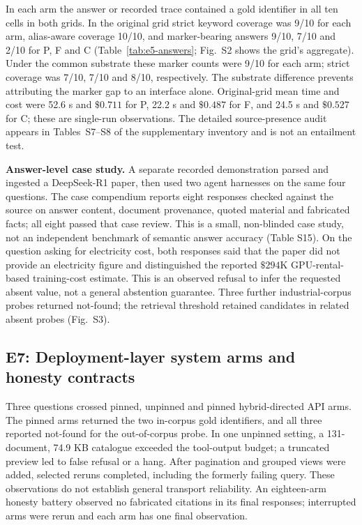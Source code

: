 In each arm the answer or recorded trace contained a gold identifier in all
ten cells in both grids. In the
original grid strict keyword coverage was 9/10 for each arm, alias-aware
coverage 10/10, and marker-bearing answers 9/10, 7/10 and 2/10 for P, F and
C (Table~\ref{tab:e5-answers}; Fig.~S2 shows the grid's aggregate). Under the common substrate these marker
counts were 9/10 for each arm; strict coverage was 7/10, 7/10 and 8/10,
respectively. The substrate difference prevents attributing the marker gap to
an interface alone. Original-grid mean time and cost were 52.6 s and $\$0.711$
for P, 22.2 s and $\$0.487$ for F, and 24.5 s and $\$0.527$ for C; these are
single-run observations. The detailed source-presence audit appears in
Tables~S7--S8 of the supplementary inventory and is not an entailment test.

\textbf{Answer-level case study.} A separate recorded demonstration parsed and
ingested a DeepSeek-R1 paper, then used two agent harnesses on the same four
questions. The case compendium reports eight responses checked against the
source on answer content, document provenance, quoted material and fabricated
facts; all eight passed that case review. This is a small, non-blinded case
study, not an independent benchmark of semantic answer accuracy (Table S15). On the
question asking for electricity cost, both responses said that the paper did
not provide an electricity figure and distinguished the reported $\$294$K
GPU-rental-based training-cost estimate. This is an observed refusal to infer
the requested absent value, not a general abstention guarantee. Three further
industrial-corpus probes returned not-found; the retrieval threshold retained
candidates in related absent probes (Fig.~S3).

\subsection{E7: Deployment-layer system arms and honesty contracts}
\label{sec:sysarms}
Three questions crossed pinned, unpinned and pinned hybrid-directed API arms.
The pinned arms returned the two in-corpus gold identifiers, and all three
reported not-found for the out-of-corpus probe. In one unpinned setting, a
131-document, 74.9 KB catalogue exceeded the tool-output budget; a truncated
preview led to false refusal or a hang. After pagination and grouped views were
added, selected reruns completed, including the formerly failing query. These
observations do not establish general transport reliability. An eighteen-arm
honesty battery observed no fabricated citations in its final responses;
interrupted arms were rerun and each arm has one final observation.

